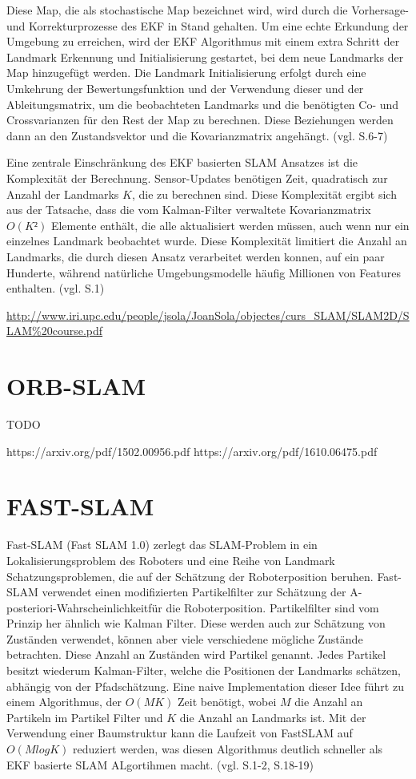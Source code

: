 Diese Map, die als stochastische Map bezeichnet wird, wird durch die Vorhersage- und Korrekturprozesse des EKF in Stand gehalten. Um eine echte Erkundung der Umgebung zu erreichen, wird der EKF Algorithmus mit einem extra Schritt der Landmark Erkennung und Initialisierung gestartet, bei dem neue Landmarks der Map hinzugefügt werden. Die Landmark Initialisierung erfolgt durch eine Umkehrung der Bewertungsfunktion und der Verwendung dieser und der Ableitungsmatrix, um die beobachteten Landmarks und die benötigten Co- und Crossvarianzen für den Rest der Map zu berechnen. Diese Beziehungen werden dann an den Zustandsvektor und die Kovarianzmatrix angehängt. (vgl. \cite{ekf_slam} S.6-7)

Eine zentrale Einschränkung des EKF basierten SLAM Ansatzes ist die Komplexität der Berechnung. Sensor-Updates benötigen Zeit, quadratisch zur Anzahl der Landmarks \(K\), die zu berechnen sind. Diese Komplexität ergibt sich aus der Tatsache, dass die vom Kalman-Filter verwaltete Kovarianzmatrix \(O(K²)\) Elemente enthält, die alle aktualisiert werden müssen, auch wenn nur ein einzelnes Landmark beobachtet wurde. Diese Komplexität limitiert die Anzahl an Landmarks, die durch diesen Ansatz verarbeitet werden konnen, auf ein paar Hunderte, während natürliche Umgebungsmodelle häufig Millionen von Features enthalten. (vgl. \cite{ekf_problems} S.1)

\url{http://www.iri.upc.edu/people/jsola/JoanSola/objectes/curs_SLAM/SLAM2D/SLAM%20course.pdf}

\section{ORB-SLAM}
TODO

https://arxiv.org/pdf/1502.00956.pdf
https://arxiv.org/pdf/1610.06475.pdf

\section{FAST-SLAM}

Fast-SLAM (Fast SLAM 1.0) zerlegt das SLAM-Problem in ein Lokalisierungsproblem des Roboters und eine Reihe von Landmark Schatzungsproblemen, die auf der Schätzung der Roboterposition beruhen. Fast-SLAM verwendet einen modifizierten Partikelfilter zur Schätzung der \glqq A-posteriori-Wahrscheinlichkeit\grqq  für die Roboterposition. Partikelfilter sind vom Prinzip her ähnlich wie Kalman Filter. Diese werden auch zur Schätzung von Zuständen verwendet, können aber viele verschiedene mögliche Zustände betrachten. Diese Anzahl an Zuständen wird Partikel genannt. Jedes Partikel besitzt wiederum Kalman-Filter, welche die Positionen der Landmarks schätzen, abhängig von der Pfadschätzung. Eine naive Implementation dieser Idee führt zu einem Algorithmus, der \(O(MK)\) Zeit benötigt, wobei \(M\) die Anzahl an Partikeln im Partikel Filter und \( K\) die Anzahl an Landmarks ist. Mit der Verwendung einer Baumstruktur kann die Laufzeit von FastSLAM auf \(O(MlogK)\) reduziert werden, was diesen Algorithmus deutlich schneller als EKF basierte SLAM ALgortihmen macht. (vgl. \cite{ekf_problems} S.1-2, \cite{slam_studi} S.18-19)

